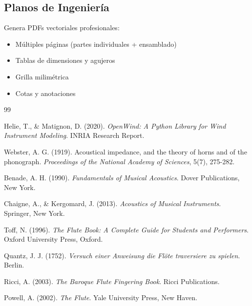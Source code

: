 \documentclass[12pt,a4paper,twocolumn]{article}
\begin{document}
\subsection{Planos de Ingeniería}

Genera PDFs vectoriales profesionales:
\begin{itemize}
    \item Múltiples páginas (partes individuales + ensamblado)
    \item Tablas de dimensiones y agujeros
    \item Grilla milimétrica
    \item Cotas y anotaciones
\end{itemize}

\begin{thebibliography}{99}

Helie, T., \& Matignon, D. (2020).
\textit{OpenWind: A Python Library for Wind Instrument Modeling}.
INRIA Research Report.

Webster, A. G. (1919).
Acoustical impedance, and the theory of horns and of the phonograph.
\textit{Proceedings of the National Academy of Sciences}, 5(7), 275-282.

Benade, A. H. (1990).
\textit{Fundamentals of Musical Acoustics}.
Dover Publications, New York.

Chaigne, A., \& Kergomard, J. (2013).
\textit{Acoustics of Musical Instruments}.
Springer, New York.

Toff, N. (1996).
\textit{The Flute Book: A Complete Guide for Students and Performers}.
Oxford University Press, Oxford.

Quantz, J. J. (1752).
\textit{Versuch einer Anweisung die Flöte traversiere zu spielen}.
Berlin.

Ricci, A. (2003).
\textit{The Baroque Flute Fingering Book}.
Ricci Publications.

Powell, A. (2002).
\textit{The Flute}.
Yale University Press, New Haven.

\end{thebibliography}
\end{document}
